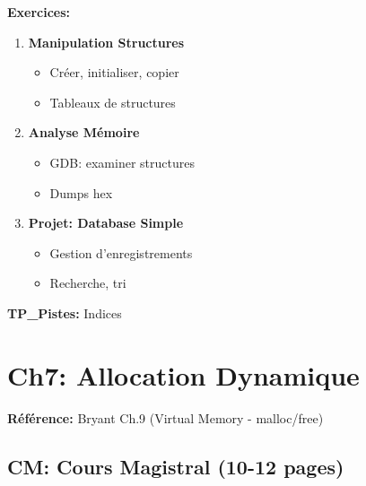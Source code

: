 \documentclass[10pt,a4paper]{article}
\begin{document}
\textbf{Exercices:}
\begin{enumerate}
\item \textbf{Manipulation Structures}
   \begin{itemize}
   \item Créer, initialiser, copier
   \item Tableaux de structures
   \end{itemize}

\item \textbf{Analyse Mémoire}
   \begin{itemize}
   \item GDB: examiner structures
   \item Dumps hex
   \end{itemize}

\item \textbf{Projet: Database Simple}
   \begin{itemize}
   \item Gestion d'enregistrements
   \item Recherche, tri
   \end{itemize}
\end{enumerate}

\textbf{TP\_Pistes:} Indices

\newpage

\section{Ch7: Allocation Dynamique}

\textbf{Référence:} Bryant Ch.9 (Virtual Memory - malloc/free)

\subsection*{CM: Cours Magistral (10-12 pages)}
\end{document}
